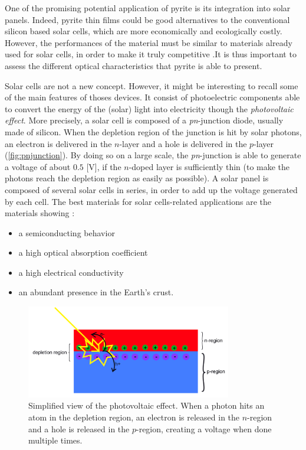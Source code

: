 \documentclass[11pt,a4paper]{article}
\begin{document}
One of the promising potential application of pyrite is its integration into solar panels. Indeed, pyrite thin films could be good alternatives to the conventional silicon based solar cells, which are more economically and ecologically costly. However, the performances of the material must be similar to materials already used for solar cells, in order to make it truly competitive \cite{pyriteSolarCells}.It is thus important to assess the different optical characteristics that pyrite is able to present. 

Solar cells are not a new concept. However, it might be interesting to recall some of the main features of thoses devices. It consist of photoelectric components able to convert the energy of the (solar) light into electricity though the \textit{photovoltaic effect}. More precisely, a solar cell is composed of a \textit{pn}-junction diode, usually made of silicon. When the depletion region of the junction is hit by solar photons, an electron is delivered in the $n$-layer and a hole is delivered in the $p$-layer (\autoref{fig:pnjunction}). By doing so on a large scale, the \textit{pn}-junction is able to generate a voltage of about $0.5$ [V], if the $n$-doped layer is sufficiently thin (to make the photons reach the depletion region as easily as possible). A solar panel is composed of several solar cells in series, in order to add up the voltage generated by each cell. The best materials for solar cells-related applications are the materials showing :
\begin{itemize}
\item a semiconducting behavior
\item a high optical absorption coefficient
\item a high electrical conductivity
\item an abundant presence in the Earth's crust.\cite{solarCell}
\end{itemize}
\begin{figure}[H]
\centering
\includegraphics[width=0.8\textwidth]{images/pnjunction.png}
\caption{Simplified view of the photovoltaic effect. When a photon hits an atom in the depletion region, an electron is released in the $n$-region and a hole is released in the $p$-region, creating a voltage when done multiple times.}
\label{fig:pnjunction}
\end{figure}
\end{document}

